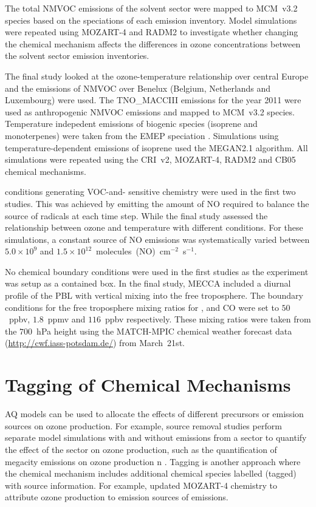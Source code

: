 The total NMVOC emissions of the solvent sector were mapped to MCM~v3.2 species based on the speciations of each emission inventory.
Model simulations were repeated using MOZART-4 and RADM2 to investigate whether changing the chemical mechanism affects the differences in ozone concentrations between the solvent sector emission inventories.

The final study looked at the ozone-temperature relationship over central Europe and the emissions of NMVOC over Benelux (Belgium, Netherlands and Luxembourg) were used.
The TNO\_MACCIII emissions for the year 2011 were used as anthropogenic NMVOC emissions and mapped to MCM~v3.2 species.
Temperature indepedent emissions of biogenic species (isoprene and monoterpenes) were taken from the EMEP speciation \citep{Simpson:2012}.
Simulations using temperature-dependent emissions of isoprene used the MEGAN2.1 \citep{Guenther:2012} algorithm.
All simulations were repeated using the CRI~v2, MOZART-4, RADM2 and CB05 chemical mechanisms.

 conditions generating VOC-and- sensitive chemistry were used in the first two studies.
This was achieved by emitting the amount of NO required to balance the source of radicals at each time step.
While the final study assessed the relationship between ozone and temperature with different  conditions.
For these simulations, a constant source of NO emissions was systematically varied between $5.0 \times 10^9$ and $1.5 \times 10^{12}$~molecules~(NO)~cm$^{-2}$~s$^{-1}$.

No chemical boundary conditions were used in the first studies as the experiment was setup as a contained box.
In the final study, MECCA included a diurnal profile of the PBL with vertical mixing into the free troposphere.
The boundary conditions for the free troposphere mixing ratios for ,  and CO were set to $50$~ppbv, $1.8$~ppmv and $116$~ppbv respectively. 
These mixing ratios were taken from the $700$~hPa height using the MATCH-MPIC chemical weather forecast data (\url{http://cwf.iass-potsdam.de/}) from March~21st.

\section{Tagging of Chemical Mechanisms} \label{s:tagging}
AQ models can be used to allocate the effects of different precursors or emission sources on ozone production.
For example, source removal studies perform separate model simulations with and without emissions from a sector to quantify the effect of the sector on ozone production, such as the quantification of megacity emissions on ozone production n \citet{Butler:2009}.
Tagging is another approach where the chemical mechanism includes additional chemical species labelled (tagged) with source information.
For example, \citet{Emmons:2012} updated MOZART-4 chemistry to attribute ozone production to emission sources of  emissions.

